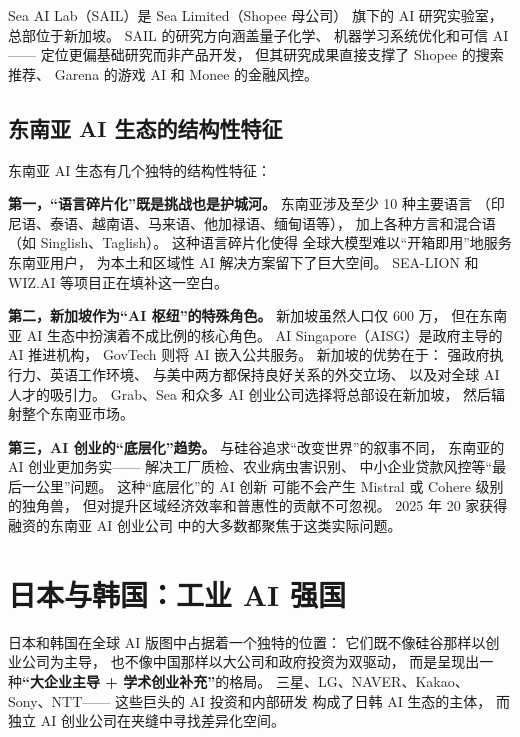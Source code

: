 Sea AI Lab（SAIL）是 Sea Limited（Shopee 母公司）
旗下的 AI 研究实验室，
总部位于新加坡。
SAIL 的研究方向涵盖量子化学、
机器学习系统优化和可信 AI——
定位更偏基础研究而非产品开发，
但其研究成果直接支撑了 Shopee 的搜索推荐、
Garena 的游戏 AI 和 Monee 的金融风控。

\subsection{东南亚 AI 生态的结构性特征}

东南亚 AI 生态有几个独特的结构性特征：

\textbf{第一，``语言碎片化''既是挑战也是护城河。}
东南亚涉及至少 10 种主要语言
（印尼语、泰语、越南语、马来语、他加禄语、缅甸语等），
加上各种方言和混合语（如 Singlish、Taglish）。
这种语言碎片化使得
全球大模型难以``开箱即用''地服务东南亚用户，
为本土和区域性 AI 解决方案留下了巨大空间。
SEA-LION 和 WIZ.AI 等项目正在填补这一空白。

\textbf{第二，新加坡作为``AI 枢纽''的特殊角色。}
新加坡虽然人口仅 600 万，
但在东南亚 AI 生态中扮演着不成比例的核心角色。
AI Singapore（AISG）是政府主导的 AI 推进机构，
GovTech 则将 AI 嵌入公共服务。
新加坡的优势在于：
强政府执行力、英语工作环境、
与美中两方都保持良好关系的外交立场、
以及对全球 AI 人才的吸引力。
Grab、Sea 和众多 AI 创业公司选择将总部设在新加坡，
然后辐射整个东南亚市场。

\textbf{第三，AI 创业的``底层化''趋势。}
与硅谷追求``改变世界''的叙事不同，
东南亚的 AI 创业更加务实——
解决工厂质检、农业病虫害识别、
中小企业贷款风控等``最后一公里''问题。
这种``底层化''的 AI 创新
可能不会产生 Mistral 或 Cohere 级别的独角兽，
但对提升区域经济效率和普惠性的贡献不可忽视。
2025 年 20 家获得融资的东南亚 AI 创业公司
中的大多数都聚焦于这类实际问题。

\section{日本与韩国：工业 AI 强国}
\label{sec:global-japan-korea}

日本和韩国在全球 AI 版图中占据着一个独特的位置：
它们既不像硅谷那样以创业公司为主导，
也不像中国那样以大公司和政府投资为双驱动，
而是呈现出一种\textbf{``大企业主导 + 学术创业补充''}的格局。
三星、LG、NAVER、Kakao、Sony、NTT——
这些巨头的 AI 投资和内部研发
构成了日韩 AI 生态的主体，
而独立 AI 创业公司在夹缝中寻找差异化空间。

